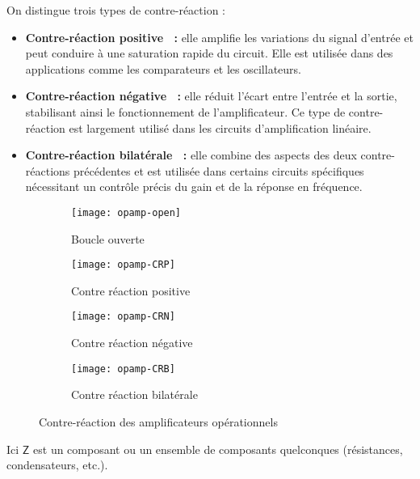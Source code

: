 On distingue trois types de contre-réaction :

\begin{itemize}
    \item \textbf{Contre-réaction positive ~:} elle amplifie les variations du signal d’entrée et peut conduire à une saturation rapide du circuit. Elle est utilisée dans des applications comme les comparateurs et les oscillateurs.
    \item \textbf{Contre-réaction négative ~:} elle réduit l’écart entre l’entrée et la sortie, stabilisant ainsi le fonctionnement de l’amplificateur. Ce type de contre-réaction est largement utilisé dans les circuits d’amplification linéaire.
    \item \textbf{Contre-réaction bilatérale ~:} elle combine des aspects des deux contre-réactions précédentes et est utilisée dans certains circuits spécifiques nécessitant un contrôle précis du gain et de la réponse en fréquence.
\end{itemize}

\begin{figure}[H]
    \begin{subfigure}[h]{0.49\textwidth}
        \centering
        \texttt{[image: opamp-open]}
        \caption{Boucle ouverte}
        \label{fig:opamp-open}
    \end{subfigure}
    \begin{subfigure}[h]{0.49\textwidth}
        \centering
        \texttt{[image: opamp-CRP]}
        \caption{Contre réaction positive}
        \label{fig:opamp-CRP}
    \end{subfigure}
    \vfill
    \begin{subfigure}[h]{0.49\textwidth}
        \centering
        \texttt{[image: opamp-CRN]}
        \caption{Contre réaction négative}
        \label{fig:opamp-CRN}
    \end{subfigure}
    \begin{subfigure}[h]{0.49\textwidth}
        \centering
        \texttt{[image: opamp-CRB]}
        \caption{Contre réaction bilatérale}
        \label{fig:opamp-CRB}
    \end{subfigure}
    \caption{Contre-réaction des amplificateurs opérationnels}
    \label{figOpampCR}
\end{figure}

Ici \(\mathsf{Z}\) est un composant ou un ensemble de composants quelconques 
(résistances, condensateurs, etc.).


